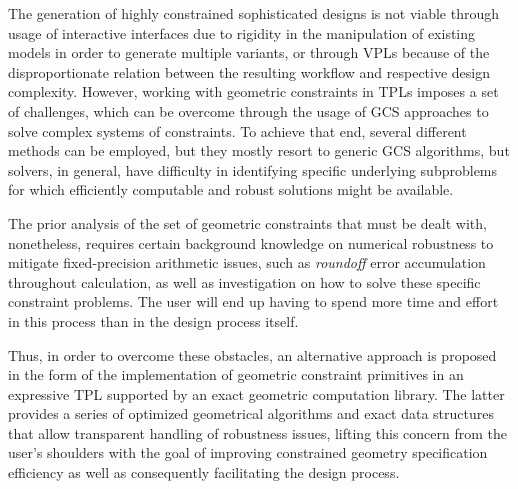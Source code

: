 %
\label{chap:conclusion}
\cleardoublepage{}


\noindent
The generation of highly constrained sophisticated designs is not viable through
usage of interactive interfaces due to rigidity in the manipulation of existing
models in order to generate multiple variants, or through \acp{VPL} because of
the disproportionate relation between the resulting workflow and respective
design complexity.  However, working with geometric constraints in \acp{TPL}
imposes a set of challenges, which can be overcome through the usage of \ac{GCS}
approaches to solve complex systems of constraints.  To achieve that end,
several different methods can be employed, but they mostly resort to generic
\acs{GCS} algorithms, but solvers, in general, have difficulty in identifying
specific underlying subproblems for which efficiently computable and robust
solutions might be available.

The prior analysis of the set of geometric constraints that must be dealt with,
nonetheless, requires certain background knowledge on numerical robustness to
mitigate fixed-precision arithmetic issues, such as \textit{roundoff} error
accumulation throughout calculation, as well as investigation on how to solve
these specific constraint problems.  The user will end up having to spend more
time and effort in this process than in the design process itself.

Thus, in order to overcome these obstacles, an alternative approach is proposed
in the form of the implementation of geometric constraint primitives in an
expressive \ac{TPL} supported by an exact geometric computation library.  The
latter provides a series of optimized geometrical algorithms and exact data
structures that allow transparent handling of robustness issues, lifting this
concern from the user's shoulders with the goal of improving constrained
geometry specification efficiency as well as consequently facilitating the
design process.
